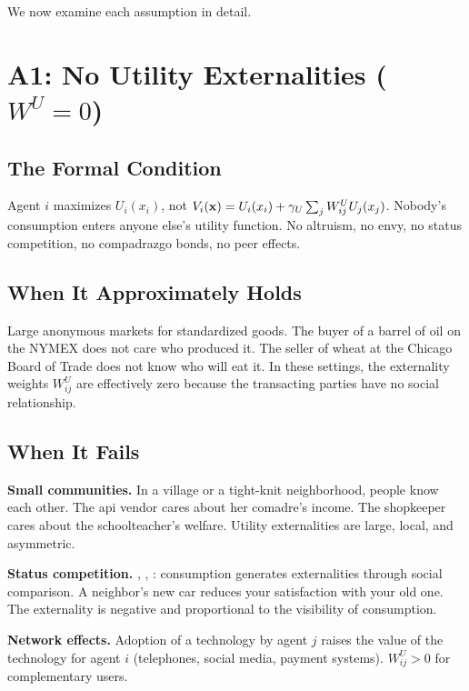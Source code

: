 \documentclass[../structural_economics_book.tex]{subfiles}
\begin{document}
We now examine each assumption in detail.


\section{A1: No Utility Externalities ($W^U = 0$)}
\label{ch04:sec:A1}

\subsection{The Formal Condition}

Agent $i$ maximizes $U_i(x_i)$, not $V_i(\mathbf{x}) = U_i(x_i) + \gamma_U \sum_j W^U_{ij} U_j(x_j)$. Nobody's consumption enters anyone else's utility function. No altruism, no envy, no status competition, no compadrazgo bonds, no peer effects.

\subsection{When It Approximately Holds}

Large anonymous markets for standardized goods. The buyer of a barrel of oil on the NYMEX does not care who produced it. The seller of wheat at the Chicago Board of Trade does not know who will eat it. In these settings, the externality weights $W^U_{ij}$ are effectively zero because the transacting parties have no social relationship.

\subsection{When It Fails}

\textbf{Small communities.} In a village or a tight-knit neighborhood, people know each other. The api vendor cares about her comadre's income. The shopkeeper cares about the schoolteacher's welfare. Utility externalities are large, local, and asymmetric.

\textbf{Status competition.} \citet{veblen1899theory}, \citet{duesenberry1949income}, \citet{frank1985choosing}: consumption generates externalities through social comparison. A neighbor's new car reduces your satisfaction with your old one. The externality is negative and proportional to the visibility of consumption.

\textbf{Network effects.} Adoption of a technology by agent $j$ raises the value of the technology for agent $i$ (telephones, social media, payment systems). $W^U_{ij} > 0$ for complementary users.
\end{document}
